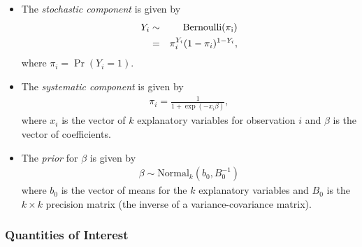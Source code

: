 \begin{itemize}
\item The \emph{stochastic component} is given by
\begin{eqnarray*}
Y_{i}  &  \sim & \rm{Bernoulli}(\pi_{i})\\
&  = & \pi_{i}^{Y_{i}}(1-\pi_{i})^{1-Y_{i}},
\end{eqnarray*}
where $\pi_{i}=\Pr(Y_{i}=1)$.

\item The \emph{systematic component} is given by
\begin{eqnarray*}
\pi_{i}= \frac{1}{1+\exp(-x_{i} \beta)},
\end{eqnarray*}
where $x_{i}$ is the vector of $k$ explanatory variables for observation $i$
and $\beta$ is the vector of coefficients.

\item The \emph{prior} for $\beta$ is given by
\begin{eqnarray*}
\beta \sim \textrm{Normal}_k \left(  b_{0},B_{0}^{-1}\right)
\end{eqnarray*}
where $b_{0}$ is the vector of means for the $k$ explanatory variables
and $B_{0}$ is the $k \times k$ precision matrix (the inverse of a
variance-covariance matrix).
\end{itemize}

\subsubsection{Quantities of Interest}

